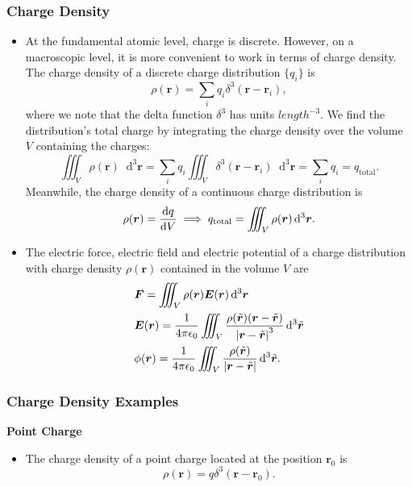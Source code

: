 \documentclass[11pt, a4paper]{article}
\newcommand{\diff}{\mathop{}\!\mathrm{d}} %
\newcommand{\dr}{\diff^{3} \r}  %
\newcommand{\dtr}{\diff^{3} \tilde{\r}}  %
\renewcommand{\vec}[1]{\bm{#1}} %
\renewcommand{\t}[1]{\tilde{#1}} %
\renewcommand{\r}{\vec{r}}
\newcommand{\E}{\vec{E}} %
\newcommand{\ee}{\epsilon_{0}}  %
\begin{document}
\subsubsection{Charge Density}
\begin{itemize}
	\item At the fundamental atomic level, charge is discrete. However, on a macroscopic level, it is more convenient to work in terms of charge density. The charge density of a discrete charge distribution $ \{q_{i}\} $ is
	\begin{equation*}
		\rho (\r) = \sum_{i} q_{i}\delta^{3}(\r - \r_{i}),
	\end{equation*}
	where we note that the delta function $ \delta^{3} $ has units $ \si{length^{-3}} $. We find the distribution's total charge by integrating the charge density over the volume $ V $ containing the charges:
	\begin{equation*}
		\iiint_{V} \rho(\r) \dr  = \sum_{i} q_{i}\iiint_{V} \delta^{3}(\r - \r_{i})\dr = \sum_{i} q_{i} = q_{\text{total}}.
	\end{equation*}
	Meanwhile, the charge density of a continuous charge distribution is
	\begin{equation*}
		\rho(\r) = \dv{q}{V} \implies q_{\text{total}} = \iiint_{V} \rho(\r) \dr.
	\end{equation*}
	
	\item The electric force, electric field and electric potential of a charge distribution with charge density $ \rho(\r) $  contained in the volume $ V $ are
	\begin{align*}
		& \vec{F} = \iiint_{V} \rho(\r) \E(\r) \dr \\
		& \E(\r) = \frac{1}{4\pi \ee} \iiint_{V}\frac{\rho(\t{\r})(\r - \t{\r})}{\abs{\r - \t{\r}}^{3}} \dtr\\
		& \phi (\r) = \frac{1}{4\pi \ee}\iiint_{V}\frac{\rho(\t{\r})}{\abs{\r - \t{\r}}}\dtr.
	\end{align*}
\end{itemize}

\subsubsection{Charge Density Examples}

\vspace{2mm}
\textbf{Point Charge} 
\begin{itemize}
	\item The charge density of a point charge located at the position $ \r_{0} $ is
	\begin{equation*}
		\rho (\r) = q \delta^{3}(\r - \r_{0}).
	\end{equation*}
\end{itemize}	
	
\end{document}
